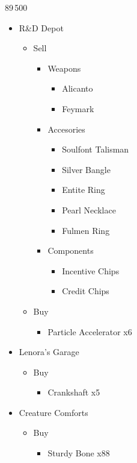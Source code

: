 \begin{shop}{89\,500}
	\begin{itemize}
		\item R\&D Depot
			\begin{itemize}
				\item Sell
					\begin{itemize}
						\item Weapons
							\begin{itemize}
								\item Alicanto
								\item Feymark
							\end{itemize}
						\item Accesories
							\begin{itemize}
								\item Soulfont Talisman
								\item Silver Bangle
								\item Entite Ring
								\item Pearl Necklace
								\item Fulmen Ring
							\end{itemize}
						\item Components
							\begin{itemize}
								\item Incentive Chips
								\item Credit Chips
							\end{itemize}
					\end{itemize}
				\item Buy
					\begin{itemize}
						\item Particle Accelerator x6
					\end{itemize}
			\end{itemize}
		\item Lenora's Garage
			\begin{itemize}
				\item Buy
					\begin{itemize}
						\item Crankshaft x5
					\end{itemize}
			\end{itemize}
		\item Creature Comforts
			\begin{itemize}
				\item Buy
					\begin{itemize}
						\item Sturdy Bone x88

\end{itemize}
\end{itemize}
\end{itemize}
\end{shop}
